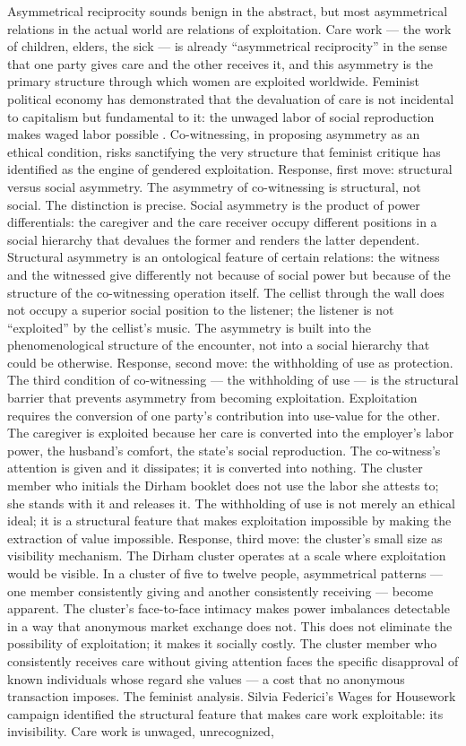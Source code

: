 Asymmetrical reciprocity sounds benign in the abstract, but most asymmetrical relations in the actual world are relations of exploitation. Care work — the work of children, elders, the sick — is already “asymmetrical reciprocity” in the sense that one party gives care and the other receives it, and this asymmetry is the primary structure through which women are exploited worldwide. Feminist political economy has demonstrated that the devaluation of care is not incidental to capitalism but fundamental to it: the unwaged labor of social reproduction makes waged labor possible \cite[pp.~63--88]{federici_2004}. Co-witnessing, in proposing asymmetry as an ethical condition, risks sanctifying the very structure that feminist critique has identified as the engine of gendered exploitation. Response, first move: structural versus social asymmetry. The asymmetry of co-witnessing is structural, not social. The distinction is precise. Social asymmetry is the product of power differentials: the caregiver and the care receiver occupy different positions in a social hierarchy that devalues the former and renders the latter dependent. Structural asymmetry is an ontological feature of certain relations: the witness and the witnessed give differently not because of social power but because of the structure of the co-witnessing operation itself. The cellist through the wall does not occupy a superior social position to the listener; the listener is not “exploited” by the cellist’s music. The asymmetry is built into the phenomenological structure of the encounter, not into a social hierarchy that could be otherwise. Response, second move: the withholding of use as protection. The third condition of co-witnessing — the withholding of use — is the structural barrier that prevents asymmetry from becoming exploitation. Exploitation requires the conversion of one party’s contribution into use-value for the other. The caregiver is exploited because her care is converted into the employer’s labor power, the husband’s comfort, the state’s social reproduction. The co-witness’s attention is given and it dissipates; it is converted into nothing. The cluster member who initials the Dirham booklet does not use the labor she attests to; she stands with it and releases it. The withholding of use is not merely an ethical ideal; it is a structural feature that makes exploitation impossible by making the extraction of value impossible. Response, third move: the cluster’s small size as visibility mechanism. The Dirham cluster operates at a scale where exploitation would be visible. In a cluster of five to twelve people, asymmetrical patterns — one member consistently giving and another consistently receiving — become apparent. The cluster’s face-to-face intimacy makes power imbalances detectable in a way that anonymous market exchange does not. This does not eliminate the possibility of exploitation; it makes it socially costly. The cluster member who consistently receives care without giving attention faces the specific disapproval of known individuals whose regard she values — a cost that no anonymous transaction imposes. The feminist analysis. Silvia Federici’s Wages for Housework campaign identified the structural feature that makes care work exploitable: its invisibility. Care work is unwaged, unrecognized, 